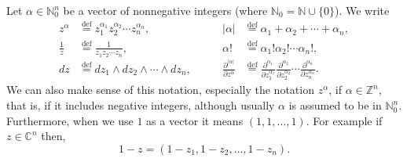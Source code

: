 \documentclass[12pt,openany]{book}
\newcommand{\sabs}[1]{\lvert {#1} \rvert}
\newcommand{\C}{{\mathbb{C}}}
\newcommand{\Z}{{\mathbb{Z}}}
\newcommand{\N}{{\mathbb{N}}}
\theoremstyle{plain}
\theoremstyle{remark}
\theoremstyle{definition}
\theoremstyle{exercise}
\theoremstyle{example}
\begin{document}
Let $\alpha \in \N_0^n$
be a vector of nonnegative integers
(where $\N_0 = \N \cup \{ 0\}$).
We write
\begin{equation*}
\begin{aligned}
z^\alpha & \overset{\text{def}}{=} z_1^{\alpha_1}z_2^{\alpha_2} \cdots
z_n^{\alpha_n} , \\
\frac{1}{z} & \overset{\text{def}}{=} \frac{1}{z_1z_2 \cdots z_n} , \\
dz & \overset{\text{def}}{=} dz_1 \wedge dz_2 \wedge \cdots \wedge dz_n , \\
\end{aligned}
\qquad
\begin{aligned}
\sabs{\alpha} & \overset{\text{def}}{=} \alpha_1 + \alpha_2 + \cdots +
\alpha_n , \\
\alpha! & \overset{\text{def}}{=} \alpha_1!\alpha_2! \cdots \alpha_n! , \\
\frac{\partial^{\sabs{\alpha}}}{\partial z^\alpha} & \overset{\text{def}}{=}
\frac{\partial^{\alpha_1}}{\partial z_1^{\alpha_1}}
\frac{\partial^{\alpha_2}}{\partial z_2^{\alpha_2}}
\cdots
\frac{\partial^{\alpha_n}}{\partial z_n^{\alpha_n}}
.
\end{aligned}
\end{equation*}
We can also make sense of this notation, especially the notation $z^\alpha$,
if $\alpha \in \Z^n$, that is, if it includes negative integers,
although usually $\alpha$ is assumed to be in $\N_0^n$.
Furthermore, when we use $1$ as a vector it means $(1,1,\ldots,1)$.
For example if $z \in \C^n$ then,
\begin{equation*}
1-z = (1-z_1,1-z_2,\ldots,1-z_n) .
\end{equation*}
\end{document}
